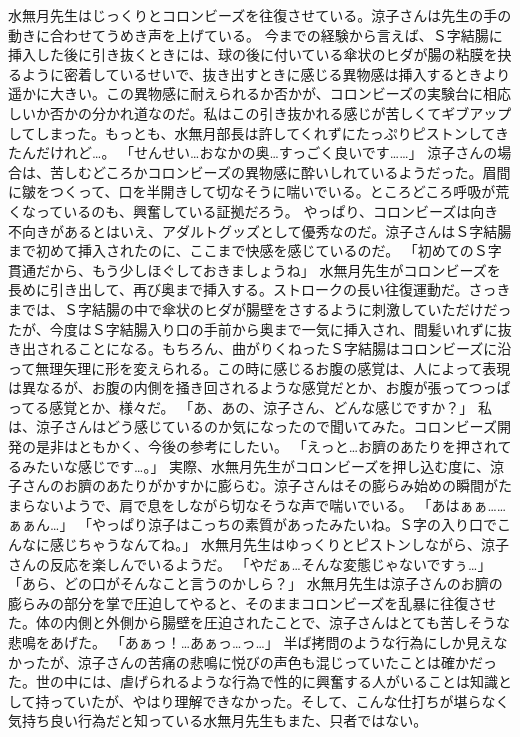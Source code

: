 水無月先生はじっくりとコロンビーズを往復させている。涼子さんは先生の手の動きに合わせてうめき声を上げている。
今までの経験から言えば、Ｓ字結腸に挿入した後に引き抜くときには、球の後に付いている傘状のヒダが腸の粘膜を抉るように密着しているせいで、抜き出すときに感じる異物感は挿入するときより遥かに大きい。この異物感に耐えられるか否かが、コロンビーズの実験台に相応しいか否かの分かれ道なのだ。私はこの引き抜かれる感じが苦しくてギブアップしてしまった。もっとも、水無月部長は許してくれずにたっぷりピストンしてきたんだけれど…。
「せんせい…おなかの奥…すっごく良いです……」
涼子さんの場合は、苦しむどころかコロンビーズの異物感に酔いしれているようだった。眉間に皺をつくって、口を半開きして切なそうに喘いでいる。ところどころ呼吸が荒くなっているのも、興奮している証拠だろう。
やっぱり、コロンビーズは向き不向きがあるとはいえ、アダルトグッズとして優秀なのだ。涼子さんはＳ字結腸まで初めて挿入されたのに、ここまで快感を感じているのだ。
「初めてのＳ字貫通だから、もう少しほぐしておきましょうね」
水無月先生がコロンビーズを長めに引き出して、再び奥まで挿入する。ストロークの長い往復運動だ。さっきまでは、Ｓ字結腸の中で傘状のヒダが腸壁をさするように刺激していただけだったが、今度はＳ字結腸入り口の手前から奥まで一気に挿入され、間髪いれずに抜き出されることになる。もちろん、曲がりくねったＳ字結腸はコロンビーズに沿って無理矢理に形を変えられる。この時に感じるお腹の感覚は、人によって表現は異なるが、お腹の内側を掻き回されるような感覚だとか、お腹が張ってつっぱってる感覚とか、様々だ。
「あ、あの、涼子さん、どんな感じですか？」
私は、涼子さんはどう感じているのか気になったので聞いてみた。コロンビーズ開発の是非はともかく、今後の参考にしたい。
「えっと…お臍のあたりを押されてるみたいな感じです…。」
実際、水無月先生がコロンビーズを押し込む度に、涼子さんのお臍のあたりがかすかに膨らむ。涼子さんはその膨らみ始めの瞬間がたまらないようで、肩で息をしながら切なそうな声で喘いでいる。
「あはぁぁ……ぁぁん…」
「やっぱり涼子はこっちの素質があったみたいね。Ｓ字の入り口でこんなに感じちゃうなんてね。」
水無月先生はゆっくりとピストンしながら、涼子さんの反応を楽しんでいるようだ。
「やだぁ…そんな変態じゃないですぅ…」
「あら、どの口がそんなこと言うのかしら？」
水無月先生は涼子さんのお臍の膨らみの部分を掌で圧迫してやると、そのままコロンビーズを乱暴に往復させた。体の内側と外側から腸壁を圧迫されたことで、涼子さんはとても苦しそうな悲鳴をあげた。
「あぁっ！…あぁっ…っ…」
半ば拷問のような行為にしか見えなかったが、涼子さんの苦痛の悲鳴に悦びの声色も混じっていたことは確かだった。世の中には、虐げられるような行為で性的に興奮する人がいることは知識として持っていたが、やはり理解できなかった。そして、こんな仕打ちが堪らなく気持ち良い行為だと知っている水無月先生もまた、只者ではない。
